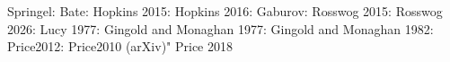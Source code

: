 \documentclass{article}
\begin{document}
	Springel: \cite{Springel2010-yg}
	Bate: \cite{Bate1995}
	Hopkins 2015: \cite{Hopkins2015-am}
	Hopkins 2016: \cite{Hopkins2016-wr}
	Gaburov: \cite{Gaburov2011-re}
	Rosswog 2015: \cite{Rosswog2015-vt}
	Rosswog 2026: \cite{Rosswog2026-ru}
	Lucy 1977: \cite{Lucy1977-rq}
	Gingold and Monaghan 1977: \cite{Gingold1977-qc}
	Gingold and Monaghan 1982: \cite{Gingold1982-xa}
	Price2012: \cite{Price2012-tc}
	Price2010 (arXiv)" \cite{Price2010-ig}
	Price 2018 \cite{Price2018-qw}
	
	
	 
	
	
\end{document}
